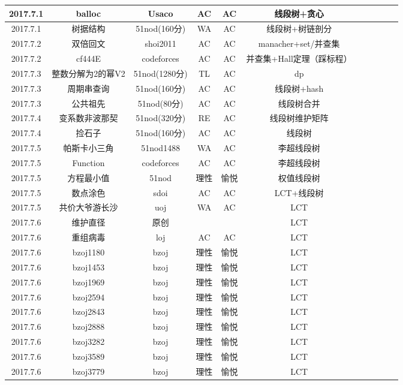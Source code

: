\documentclass[landscape]{article}
\begin{document}
\begin{longtable}{ccccccccccc}
  \hline
  2017.7.1 & balloc & Usaco & AC & AC & 线段树+贪心\\
  \hline
  2017.7.1 & 树据结构 & 51nod(160分) & WA & AC & 线段树+树链剖分\\
  \hline
  2017.7.2 & 双倍回文 & shoi2011 & AC & AC & manacher+set/并查集\\
  \hline
  2017.7.2 & cf444E & codeforces & AC & AC & 并查集+Hall定理（踩标程）\\
  \hline
  2017.7.3 & 整数分解为2的幂V2 & 51nod(1280分) & TL & AC & dp\\
  \hline
  2017.7.3 & 周期串查询 & 51nod(160分) & AC & AC & 线段树+hash\\
  \hline
  2017.7.3 & 公共祖先 & 51nod(80分) & AC & AC & 线段树合并\\
  \hline
  2017.7.4 & 变系数非波那契 & 51nod(320分) & RE & AC & 线段树维护矩阵\\
  \hline
  2017.7.4 & 捡石子 & 51nod(160分) & AC & AC & 线段树\\
  \hline
  2017.7.5 & 帕斯卡小三角 & 51nod1488 & WA & AC & 李超线段树\\
  \hline
  2017.7.5 & Function & codeforces & AC & AC & 李超线段树\\
  \hline
  2017.7.5 & 方程最小值 & 51nod & 理性 & 愉悦 & 权值线段树\\
  \hline
  2017.7.5 & 数点涂色 & sdoi & AC & AC & LCT+线段树\\
  \hline
  2017.7.5 & 共价大爷游长沙 & uoj & WA & AC & LCT\\
  \hline
  2017.7.6 & 维护直径 & 原创 & & & LCT\\
  \hline
  2017.7.6 & 重组病毒 & loj & AC & AC & LCT\\
  \hline
  2017.7.6 & bzoj1180 & bzoj & 理性 & 愉悦 & LCT\\
  \hline
  2017.7.6 & bzoj1453 & bzoj & 理性 & 愉悦 & LCT\\
  \hline
  2017.7.6 & bzoj1969 & bzoj & 理性 & 愉悦 & LCT\\
  \hline
  2017.7.6 & bzoj2594 & bzoj & 理性 & 愉悦 & LCT\\
  \hline
  2017.7.6 & bzoj2843 & bzoj & 理性 & 愉悦 & LCT\\
  \hline
  2017.7.6 & bzoj2888 & bzoj & 理性 & 愉悦 & LCT\\
  \hline
  2017.7.6 & bzoj3282 & bzoj & 理性 & 愉悦 & LCT\\
  \hline
  2017.7.6 & bzoj3589 & bzoj & 理性 & 愉悦 & LCT\\
  \hline
  2017.7.6 & bzoj3779 & bzoj & 理性 & 愉悦 & LCT\\
  \hline
\end{longtable}
\end{document}
